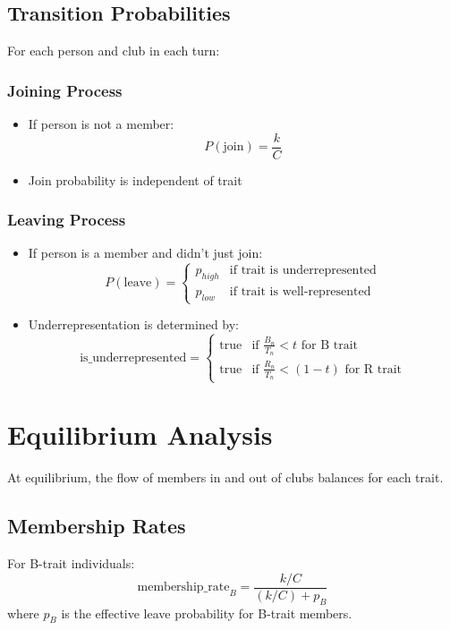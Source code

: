\documentclass{article}
\begin{document}
\subsection{Transition Probabilities}
For each person and club in each turn:

\subsubsection{Joining Process}
\begin{itemize}
    \item If person is not a member:
    \[ P(\text{join}) = \frac{k}{C} \]
    \item Join probability is independent of trait
\end{itemize}

\subsubsection{Leaving Process}
\begin{itemize}
    \item If person is a member and didn't just join:
    \[ P(\text{leave}) = \begin{cases}
        p_{high} & \text{if trait is underrepresented} \\
        p_{low} & \text{if trait is well-represented}
    \end{cases} \]
    \item Underrepresentation is determined by:
    \[ \text{is\_underrepresented} = \begin{cases}
        \text{true} & \text{if } \frac{B_n}{T_n} < t \text{ for B trait} \\
        \text{true} & \text{if } \frac{R_n}{T_n} < (1-t) \text{ for R trait}
    \end{cases} \]
\end{itemize}

\section{Equilibrium Analysis}
At equilibrium, the flow of members in and out of clubs balances for each trait.

\subsection{Membership Rates}
For B-trait individuals:
\[ \text{membership\_rate}_B = \frac{k/C}{(k/C) + p_B} \]
where $p_B$ is the effective leave probability for B-trait members.
\end{document}
